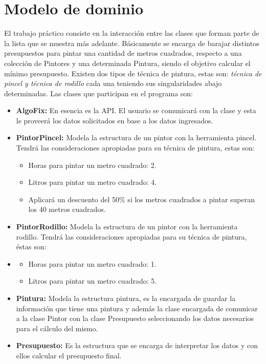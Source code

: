 \documentclass[titlepage,a4paper]{article}
\begin{document}
\section{Modelo de dominio}\label{sec:modelo}

El trabajo práctico consiste en la interacción entre las clases que forman parte de la lista que se muestra más adelante.
Básicamente se encarga de barajar distintos presupuestos para pintar una cantidad de metros cuadrados, respecto a una colección de Pintores y una determinada Pintura, siendo el objetivo calcular el mínimo presupuesto. Existen dos tipos de técnica de pintura, estas son: \textit{técnica de pincel y técnica de rodillo} cada una teniendo sus singularidades abajo determinadas.
 Las clases que participan en el programa son:
\begin{itemize}
    \item \textbf{AlgoFix:} En esencia es la API. El usuario se comunicará con la clase y esta le proveerá los datos solicitados en base a los datos ingresados.
    \item \textbf{PintorPincel:} Modela la estructura de un pintor con la herramienta pincel.
    Tendrá las consideraciones apropiadas para su técnica de pintura, estas son:
    \iten\begin{itemize}
        \item Horas para pintar un metro cuadrado: 2.
        \item Litros para pintar un metro cuadrado: 4.
        \item Aplicará un descuento del 50\% si los metros cuadrados a pintar superan los 40 metros cuadrados.
    \end{itemize}
    \item \textbf{PintorRodillo:} Modela la estructura de un pintor con la herramienta rodillo.
    Tendrá las consideraciones apropiadas para su técnica de pintura, éstas son:
    \item\begin{itemize}
        \item Horas para pintar un metro cuadrado: 1.
        \item Litros para pintar un metro cuadrado: 5.
    \end{itemize}
    \item \textbf{Pintura:} Modela la estructura pintura, es la encargada de guardar la información que tiene una pintura y además la clase encargada de comunicar a la clase Pintor con la clase Presupuesto seleccionando los datos necesarios para el cálculo del mismo.
    \item \textbf{Presupuesto:} Es la estructura que se encarga de interpretar los datos y con ellos calcular el presupuesto final.

\end{itemize}
\end{document}
